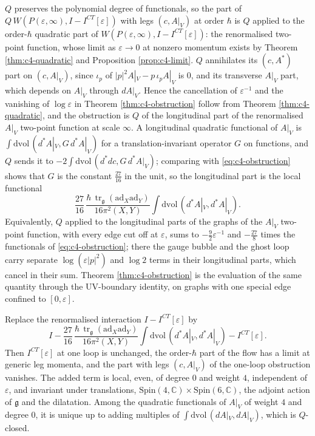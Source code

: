 \begin{remark}
\label{rem:c4-selfenergy}
$Q$ preserves the polynomial degree of functionals, so the part of $Q\,W(P(\varepsilon,\infty),I-I^{CT}[\varepsilon])$ with legs $(c,A|_V)$ at order $\hbar$ is $Q$ applied to the order-$\hbar$ quadratic part of $W(P(\varepsilon,\infty),I-I^{CT}[\varepsilon])$: the renormalised two-point function, whose limit as $\varepsilon\to0$ at nonzero momentum exists by Theorem \ref{thm:c4-quadratic} and Proposition \ref{prop:c4-limit}. $Q$ annihilates its $(c,A^*)$ part on $(c,A|_V)$, since $\iota_p$ of $|p|^2A|_V-p\,\iota_pA|_V$ is $0$, and its transverse $A|_V$ part, which depends on $A|_V$ through $dA|_V$. Hence the cancellation of $\varepsilon^{-1}$ and the vanishing of $\log\varepsilon$ in Theorem \ref{thm:c4-obstruction} follow from Theorem \ref{thm:c4-quadratic}, and the obstruction is $Q$ of the longitudinal part of the renormalised $A|_V$ two-point function at scale $\infty$. A longitudinal quadratic functional of $A|_V$ is $\int\mathrm{dvol}\,(d^*A|_V,G\,d^*A|_V)$ for a translation-invariant operator $G$ on functions, and $Q$ sends it to $-2\int\mathrm{dvol}\,(d^*dc,G\,d^*A|_V)$; comparing with \eqref{eq:c4-obstruction} shows that $G$ is the constant $\tfrac{27}{16}$ in the unit, so the longitudinal part is the local functional
\[
\frac{27}{16}\,\frac{\hbar\,\operatorname{tr}_{\mathfrak g}(\mathrm{ad}_X\mathrm{ad}_Y)}{16\pi^2(X,Y)}\int\mathrm{dvol}\,(d^*A|_V,d^*A|_V).
\]
Equivalently, $Q$ applied to the longitudinal parts of the graphs of the $A|_V$ two-point function, with every edge cut off at $\varepsilon$, sums to $-\tfrac92\varepsilon^{-1}$ and $-\tfrac{27}8$ times the functionals of \eqref{eq:c4-obstruction}; there the gauge bubble and the ghost loop carry separate $\log(\varepsilon|p|^2)$ and $\log2$ terms in their longitudinal parts, which cancel in their sum. Theorem \ref{thm:c4-obstruction} is the evaluation of the same quantity through the UV-boundary identity, on graphs with one special edge confined to $[0,\varepsilon]$.
\end{remark}

\begin{theorem}
\label{thm:c4-finite}
Replace the renormalised interaction $I-I^{CT}[\varepsilon]$ by
\begin{equation}
I-\frac{27}{16}\,\frac{\hbar\,\operatorname{tr}_{\mathfrak g}(\mathrm{ad}_X\mathrm{ad}_Y)}{16\pi^2(X,Y)}\int\mathrm{dvol}\,(d^*A|_V,d^*A|_V)-I^{CT}[\varepsilon].
\label{eq:c4-finite}
\end{equation}
Then $I^{CT}[\varepsilon]$ at one loop is unchanged, the order-$\hbar$ part of the flow has a limit at generic leg momenta, and the part with legs $(c,A|_V)$ of the one-loop obstruction vanishes. The added term is local, even, of degree $0$ and weight $4$, independent of $\varepsilon$, and invariant under translations, $\mathrm{Spin}(4,\mathbb C)\times\mathrm{Spin}(6,\mathbb C)$, the adjoint action of $\mathfrak g$ and the dilatation. Among the quadratic functionals of $A|_V$ of weight $4$ and degree $0$, it is unique up to adding multiples of $\int\mathrm{dvol}\,(dA|_V,dA|_V)$, which is $Q$-closed.
\end{theorem}

